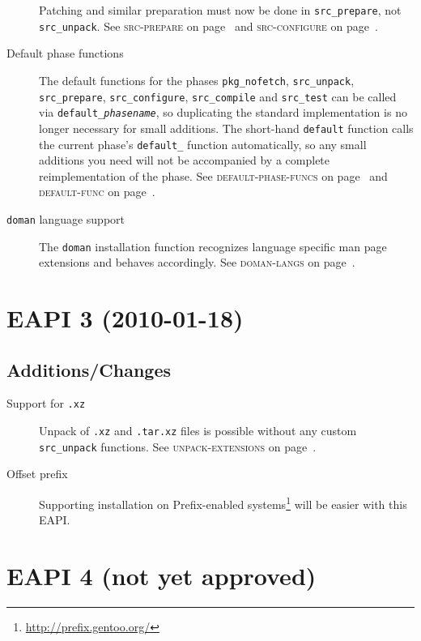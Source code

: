 \documentclass[a4paper,notumble]{leaflet}
\newcommand{\code}[1]{\texttt{#1}}
\newcommand{\featureref}[1]{\textsc{#1} on page~\pageref{feat:#1}}
\begin{document}
\begin{description}
    Patching and similar preparation must now be done in
    \code{src\_prepare}, not \code{src\_unpack}.  See
    \featureref{src-prepare} and \featureref{src-configure}.
    \item[Default phase functions] The default functions for the
    phases \code{pkg\_nofetch}, \code{src\_unpack},
    \code{src\_prepare}, \code{src\_configure}, \code{src\_compile}
    and \code{src\_test} can be called via
    \code{default\_\emph{phasename}}, so duplicating the standard
    implementation is no longer necessary for small additions.  The
    short-hand \code{default} function calls the current phase's
    \code{default\_} function automatically, so any small additions
    you need will not be accompanied by a complete reimplementation of
    the phase.  See \featureref{default-phase-funcs} and
    \featureref{default-func}.
    \item[\code{doman} language support] The \code{doman} installation
    function recognizes language specific man page extensions and
    behaves accordingly.  See \featureref{doman-langs}.
\end{description}
\newpage

\section{EAPI 3 (2010-01-18)}
\label{sec:cs:eapi3}
\subsection{Additions/Changes}
\label{sec:cs:eapi3-additions}
\begin{description}
    \item[Support for \code{.xz}] Unpack of \code{.xz} and
    \code{.tar.xz} files is possible without any custom
    \code{src\_unpack} functions.  See \featureref{unpack-extensions}.
    \item[Offset prefix] Supporting installation on Prefix-enabled
    systems\footnote{\url{http://prefix.gentoo.org/}} will be easier
    with this EAPI.
\end{description}
\section{EAPI 4 (not yet approved)}
\label{sec:cs:eapi4}
\end{document}

